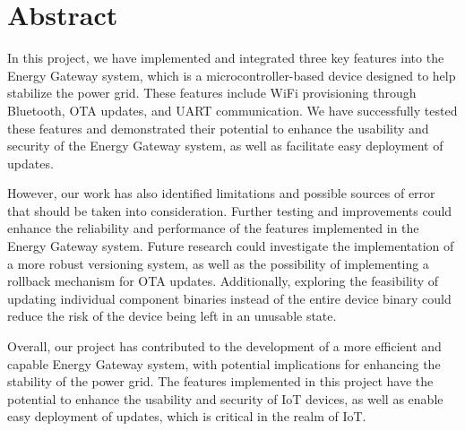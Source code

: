 \section*{Abstract}
\label{sec:abstract}

In this project, we have implemented and integrated three key features into the Energy Gateway system, which is a microcontroller-based device designed to help stabilize the power grid. These features include WiFi provisioning through Bluetooth, OTA updates, and UART communication. We have successfully tested these features and demonstrated their potential to enhance the usability and security of the Energy Gateway system, as well as facilitate easy deployment of updates.

However, our work has also identified limitations and possible sources of error that should be taken into consideration. Further testing and improvements could enhance the reliability and performance of the features implemented in the Energy Gateway system. Future research could investigate the implementation of a more robust versioning system, as well as the possibility of implementing a rollback mechanism for OTA updates. Additionally, exploring the feasibility of updating individual component binaries instead of the entire device binary could reduce the risk of the device being left in an unusable state.

Overall, our project has contributed to the development of a more efficient and capable Energy Gateway system, with potential implications for enhancing the stability of the power grid. The features implemented in this project have the potential to enhance the usability and security of IoT devices, as well as enable easy deployment of updates, which is critical in the realm of IoT.